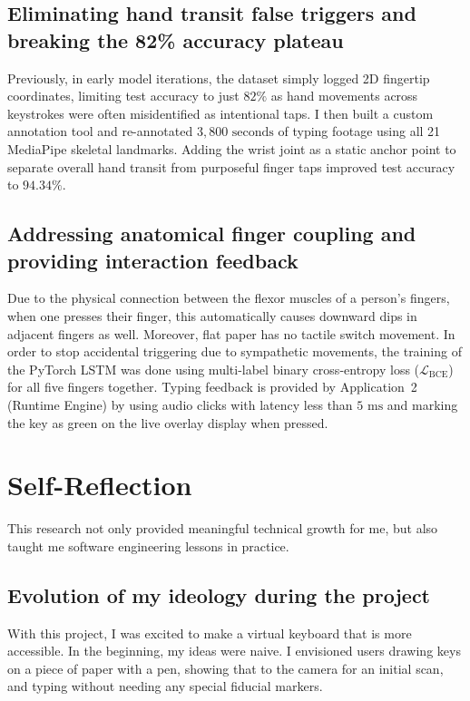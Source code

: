 \subsection{Eliminating hand transit false triggers and breaking the 82\% accuracy plateau}
\label{subsec:concl_prob_dataset}
Previously, in early model iterations, the dataset simply logged 2D fingertip coordinates, limiting test accuracy to just $82\%$ as hand movements across keystrokes were often misidentified as intentional taps. I then built a custom annotation tool and re-annotated $3,800\text{ seconds}$ of typing footage using all 21 MediaPipe skeletal landmarks. Adding the wrist joint as a static anchor point to separate overall hand transit from purposeful finger taps improved test accuracy to $94.34\%$.

\subsection{Addressing anatomical finger coupling and providing interaction feedback}
\label{subsec:concl_prob_feedback}
Due to the physical connection between the flexor muscles of a person's fingers, when one presses their finger, this automatically causes downward dips in adjacent fingers as well. Moreover, flat paper has no tactile switch movement. In order to stop accidental triggering due to sympathetic movements, the training of the PyTorch LSTM was done using multi-label binary cross-entropy loss ($\mathcal{L}_{\text{BCE}}$) for all five fingers together. Typing feedback is provided by Application~2 (Runtime Engine) by using audio clicks with latency less than $5\text{ ms}$ and marking the key as green on the live overlay display when pressed.

\section{Self-Reflection}
\label{sec:concl_reflection}
This research not only provided meaningful technical growth for me, but also taught me software engineering lessons in practice.

\subsection{Evolution of my ideology during the project}
\label{subsec:concl_ideology}
With this project, I was excited to make a virtual keyboard that is more accessible. In the beginning, my ideas were naive. I envisioned users drawing keys on a piece of paper with a pen, showing that to the camera for an initial scan, and typing without needing any special fiducial markers.

